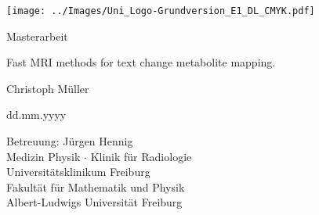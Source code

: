 \documentclass[12pt,a4paper]{scrartcl}
\numberwithin{equation}{section}
\begin{document}
  \pagestyle{empty}

%
  \begin{titlepage}

	\begin{center} \large 

	\texttt{[image: ../Images/Uni\_Logo-Grundversion\_E1\_DL\_CMYK.pdf]} 
    \vspace*{1cm} 

    Masterarbeit
    \vspace*{1cm}

    {\huge Fast MRI methods for text change metabolite mapping.}
    \vspace*{1.5cm}

    Christoph Müller
    \vspace*{1cm}

    dd.mm.yyyy
    \vspace*{1.5cm}

    Betreuung: Jürgen Hennig \\[.5cm]
		Medizin Physik $\cdot$ Klinik für Radiologie\\
		Universitätsklinikum Freiburg\\[0.5cm]
    
    	Fakultät für Mathematik und Physik \\
		Albert-Ludwigs Universität Freiburg
		
  \end{center}
\end{titlepage}

%
  \tableofcontents

%
\newpage
\pagestyle{headings}





 
%
\newpage
\begin{thebibliography}{Lam00}
 
\end{thebibliography}
      
\end{document}
